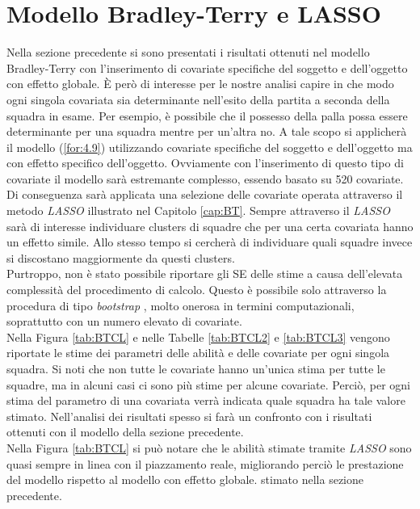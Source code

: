 


\section{Modello Bradley-Terry e LASSO}
Nella sezione precedente si sono presentati i risultati ottenuti nel modello Bradley-Terry con l'inserimento di covariate specifiche del soggetto e dell'oggetto con effetto globale. È però di interesse per le nostre analisi capire in che modo ogni singola covariata sia determinante nell'esito della partita a seconda della squadra in esame. Per esempio, è possibile che il possesso della palla possa essere determinante per una squadra mentre per un'altra no. A tale scopo si applicherà il modello (\ref{for:4.9}) utilizzando covariate specifiche del soggetto e dell'oggetto ma con effetto specifico dell'oggetto. Ovviamente con l'inserimento di questo tipo di covariate il modello sarà estremante complesso, essendo basato su 520 covariate. Di conseguenza sarà applicata una selezione delle covariate operata attraverso il metodo \emph{LASSO} illustrato nel Capitolo \ref{cap:BT}. Sempre attraverso il \emph{LASSO} sarà di interesse individuare clusters di squadre che per una certa covariata hanno un effetto simile. Allo stesso tempo si cercherà di individuare quali squadre invece si discostano maggiormente da questi clusters.\\
Purtroppo, non è stato possibile riportare gli SE delle stime a causa dell'elevata complessità del procedimento di calcolo. Questo è possibile solo attraverso la procedura di tipo \emph{bootstrap} \autocite{henderson2005bootstrap}, molto onerosa in termini computazionali, soprattutto con un numero elevato di covariate.\\
Nella Figura \ref{tab:BTCL} e nelle Tabelle \ref{tab:BTCL2} e \ref{tab:BTCL3} vengono riportate le stime dei parametri delle abilità e delle covariate per ogni singola squadra. Si noti che non tutte le covariate hanno un’unica stima per tutte le squadre, ma in alcuni casi ci sono più stime per alcune covariate. Perciò, per ogni stima del parametro di una covariata verrà indicata quale squadra ha tale valore stimato. Nell'analisi dei risultati spesso si farà un confronto con i risultati ottenuti con il modello della sezione precedente.\\%
Nella Figura \ref{tab:BTCL} si può notare che le abilità stimate tramite \emph{LASSO} sono quasi sempre in linea con il piazzamento reale, migliorando perciò le prestazione del modello rispetto al modello con effetto globale. stimato nella sezione precedente.\\
